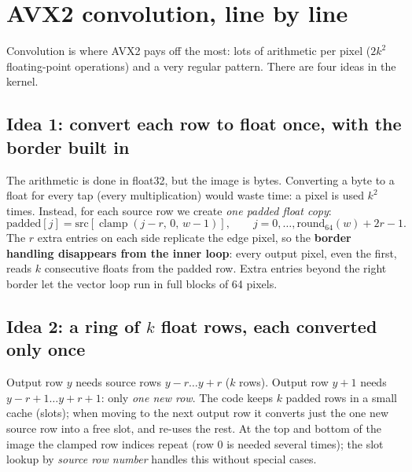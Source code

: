\chapter{AVX2 convolution, line by line}\label{ch:conv}

Convolution is where AVX2 pays off the most: lots of arithmetic per pixel ($2k^2$ floating-point operations) and a very regular pattern. There are four ideas in the kernel.

\section{Idea 1: convert each row to float once, with the border built in}

The arithmetic is done in float32, but the image is bytes. Converting a byte to a float for every tap (every multiplication) would waste time: a pixel is used $k^2$ times. Instead, for each source row we create \emph{one padded float copy}:
\[
\text{padded}[j]=\text{src}[\operatorname{clamp}(j-r,\,0,\,w-1)],\qquad j=0,\dots,\text{round}_{64}(w)+2r-1 .
\]
The $r$ extra entries on each side replicate the edge pixel, so the \textbf{border handling disappears from the inner loop}: every output pixel, even the first, reads $k$ consecutive floats from the padded row. Extra entries beyond the right border let the vector loop run in full blocks of 64 pixels.



\section{Idea 2: a ring of $k$ float rows, each converted only once}

Output row $y$ needs source rows $y-r\dots y+r$ ($k$ rows). Output row $y+1$ needs $y-r+1\dots y+r+1$: only \emph{one new row}. The code keeps $k$ padded rows in a small cache (slots); when moving to the next output row it converts just the one new source row into a free slot, and re-uses the rest. At the top and bottom of the image the clamped row indices repeat (row 0 is needed several times); the slot lookup by \emph{source row number} handles this without special cases.

\begin{center}
\end{center}

